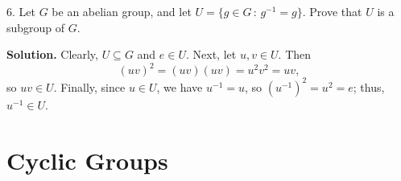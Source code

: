 \documentclass[10pt,]{book}
\theoremstyle{plain}
\theoremstyle{definition}
\theoremstyle{definition}
\theoremstyle{definition}
\theoremstyle{definition}
\numberwithin{equation}{section}
\begin{document}
\begin{exerciselist}
\item[6.]\hypertarget{exercise-33}{}Let \(G\) be an abelian group, and let \(U=\{g\in G\,:\, g^{-1}=g\}.\) Prove that \(U\) is a subgroup of \(G\).%
\par\smallskip
\par\smallskip
\noindent\textbf{Solution.}\hypertarget{solution-33}{}\quad
Clearly, \(U \subseteq G\) and \(e\in U\). Next, let \(u,v\in U\). Then%
\begin{equation*}
(uv)^2=(uv)(uv)=u^2v^2=uv,
\end{equation*}
so \(uv\in U\). Finally, since \(u\in U\), we have \(u^{-1}=u\), so \((u^{-1})^2=u^2=e\); thus, \(u^{-1}\in U\).%
\end{exerciselist}
\typeout{************************************************}
\typeout{************************************************}
\chapter[{Cyclic Groups}]{Cyclic Groups}\label{cyc}
\typeout{************************************************}
\typeout{************************************************}
\end{document}
